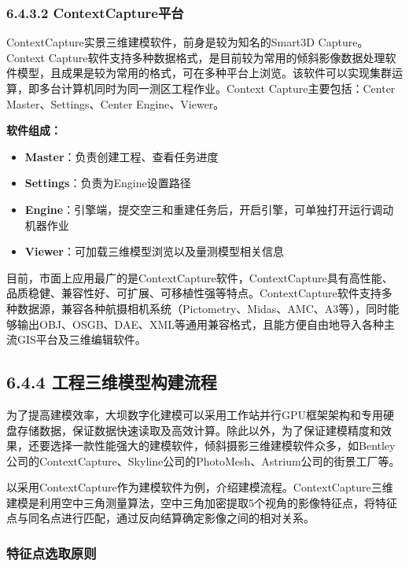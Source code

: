 \subsubsection{6.4.3.2
ContextCapture平台}\label{contextcaptureux5e73ux53f0}

ContextCapture实景三维建模软件，前身是较为知名的Smart3D Capture。Context
Capture软件支持多种数据格式，是目前较为常用的倾斜影像数据处理软件模型，且成果是较为常用的格式，可在多种平台上浏览。该软件可以实现集群运算，即多台计算机同时为同一测区工程作业。Context
Capture主要包括：Center Master、Settings、Center Engine、Viewer。

\textbf{软件组成：}

\begin{itemize}
\tightlist
\item
  \textbf{Master}：负责创建工程、查看任务进度
\item
  \textbf{Settings}：负责为Engine设置路径
\item
  \textbf{Engine}：引擎端，提交空三和重建任务后，开启引擎，可单独打开运行调动机器作业
\item
  \textbf{Viewer}：可加载三维模型浏览以及量测模型相关信息
\end{itemize}

目前，市面上应用最广的是ContextCapture软件，ContextCapture具有高性能、品质稳健、兼容性好、可扩展、可移植性强等特点。ContextCapture软件支持多种数据源，兼容各种航摄相机系统（Pictometry、Midas、AMC、A3等），同时能够输出OBJ、OSGB、DAE、XML等通用兼容格式，且能方便自由地导入各种主流GIS平台及三维编辑软件。

\subsection{6.4.4
工程三维模型构建流程}\label{ux5de5ux7a0bux4e09ux7ef4ux6a21ux578bux6784ux5efaux6d41ux7a0b}

为了提高建模效率，大坝数字化建模可以采用工作站并行GPU框架架构和专用硬盘存储数据，保证数据快速读取及高效计算。除此以外，为了保证建模精度和效果，还要选择一款性能强大的建模软件，倾斜摄影三维建模软件众多，如Bentley公司的ContextCapture、Skyline公司的PhotoMesh、Astrium公司的街景工厂等。

以采用ContextCapture作为建模软件为例，介绍建模流程。ContextCapture三维建模是利用空中三角测量算法，空中三角加密提取5个视角的影像特征点，将特征点与同名点进行匹配，通过反向结算确定影像之间的相对关系。

\subsubsection{特征点选取原则}\label{ux7279ux5f81ux70b9ux9009ux53d6ux539fux5219}

